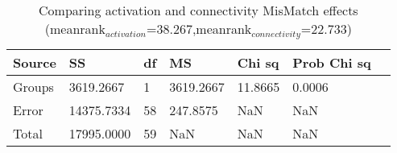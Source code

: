 \begin{table}
\centering
\begin{tabular}[0.2em]{@{}lllllll@{}}\toprule
Source & SS & df & MS & Chi sq & Prob Chi sq\\\toprule[0.2em]
Groups & 3619.2667 & 1 & 3619.2667 & 11.8665 & 0.0006 \\\midrule
Error & 14375.7334 & 58 & 247.8575 & NaN & NaN \\\midrule
Total & 17995.0000 & 59 & NaN & NaN & NaN \\\bottomrule[0.2em]
\end{tabular}
\caption{Comparing activation and connectivity MisMatch effects (meanrank$_{activation}$=38.267,meanrank$_{connectivity}$=22.733)\label{tabel:mismatchMetric}}
\end{table}
